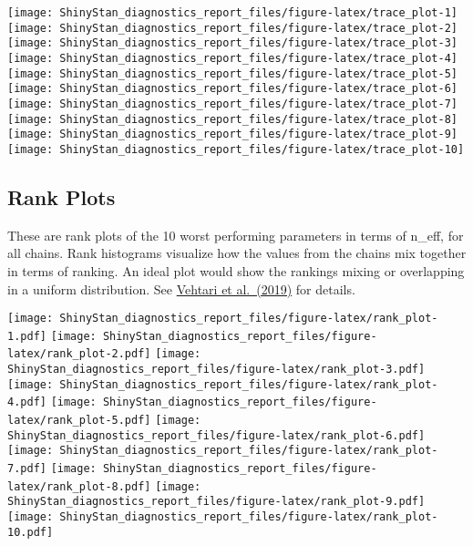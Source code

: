 \documentclass[11pt,]{article}
\begin{document}
\texttt{[image: ShinyStan\_diagnostics\_report\_files/figure-latex/trace\_plot-1]}
\texttt{[image: ShinyStan\_diagnostics\_report\_files/figure-latex/trace\_plot-2]}
\texttt{[image: ShinyStan\_diagnostics\_report\_files/figure-latex/trace\_plot-3]}
\texttt{[image: ShinyStan\_diagnostics\_report\_files/figure-latex/trace\_plot-4]}
\texttt{[image: ShinyStan\_diagnostics\_report\_files/figure-latex/trace\_plot-5]}
\texttt{[image: ShinyStan\_diagnostics\_report\_files/figure-latex/trace\_plot-6]}
\texttt{[image: ShinyStan\_diagnostics\_report\_files/figure-latex/trace\_plot-7]}
\texttt{[image: ShinyStan\_diagnostics\_report\_files/figure-latex/trace\_plot-8]}
\texttt{[image: ShinyStan\_diagnostics\_report\_files/figure-latex/trace\_plot-9]}
\texttt{[image: ShinyStan\_diagnostics\_report\_files/figure-latex/trace\_plot-10]}

\newpage

\hypertarget{rank-plots}{%
\subsection{Rank Plots}\label{rank-plots}}

These are rank plots of the 10 worst performing parameters in terms of
n\_eff, for all chains. Rank histograms visualize how the values from
the chains mix together in terms of ranking. An ideal plot would show
the rankings mixing or overlapping in a uniform distribution. See
\href{https://arxiv.org/abs/1903.08008}{Vehtari et al.~(2019)} for
details.

\texttt{[image: ShinyStan\_diagnostics\_report\_files/figure-latex/rank\_plot-1.pdf]}
\texttt{[image: ShinyStan\_diagnostics\_report\_files/figure-latex/rank\_plot-2.pdf]}
\texttt{[image: ShinyStan\_diagnostics\_report\_files/figure-latex/rank\_plot-3.pdf]}
\texttt{[image: ShinyStan\_diagnostics\_report\_files/figure-latex/rank\_plot-4.pdf]}
\texttt{[image: ShinyStan\_diagnostics\_report\_files/figure-latex/rank\_plot-5.pdf]}
\texttt{[image: ShinyStan\_diagnostics\_report\_files/figure-latex/rank\_plot-6.pdf]}
\texttt{[image: ShinyStan\_diagnostics\_report\_files/figure-latex/rank\_plot-7.pdf]}
\texttt{[image: ShinyStan\_diagnostics\_report\_files/figure-latex/rank\_plot-8.pdf]}
\texttt{[image: ShinyStan\_diagnostics\_report\_files/figure-latex/rank\_plot-9.pdf]}
\texttt{[image: ShinyStan\_diagnostics\_report\_files/figure-latex/rank\_plot-10.pdf]}
\end{document}
